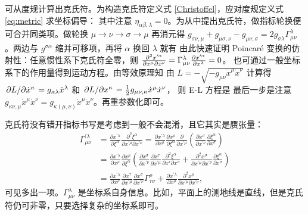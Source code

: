 可从度规计算出克氏符。为构造克氏符定义式 \eqref{Christoffel}，应对度规定义式 \eqref{eq:metric} 求坐标偏导：
其中注意 $\eta_{\alpha\beta,\lambda}=0$。为从中提出克氏符，做指标轮换便可合并同类项。做轮换 $\mu\to\nu\to\sigma\to\mu$ 再消元得 $g_{\sigma\nu,\mu}+ g_{\mu\sigma,\nu}-  g_{\mu\nu,\sigma}=2g_{\sigma\lambda}\Gamma^\lambda_{\mu\nu}$。两边与 $g^{\sigma\alpha}$ 缩并可移项，再将 $\alpha$ 换回 $\lambda$ 就有
由此快速证明 Poincaré 变换的仿射性：任意惯性系下克氏符全零，则 $\pdv{x'^\alpha}{x^\mu}{x^\nu}=\Gamma^\lambda_{\mu\nu}\pdv{x'^\alpha}{x^\lambda}=0$。
也可通过一般坐标系下的作用量得到运动方程。由等效原理知
由 $L=-\sqrt{-g_{\mu\nu}\dot x^\mu\dot x^\nu}$ 计算得 $\pdv*{L}{\dot x^\kappa}=g_{\kappa\lambda}\dot x^\lambda$ 和 $\pdv*{L}{x^\kappa}=\frac{1}{2}g_{\mu\nu,\kappa}\dot x^\mu\dot x^\nu$，
则 E-L 方程是
最后一步是注意 $g_{\kappa\nu,\mu}\dot x^\mu\dot x^\nu=g_{\kappa(\mu,\nu)}\dot x^\mu\dot x^\nu$。再重参数化即可。

克氏符没有错开指标书写是考虑到一般不会混淆，且它其实是赝张量：
\begin{align} \Gamma_{\mu \nu}^{\prime \lambda} &= \frac{\partial x^{\prime \lambda}}{\partial \xi^\alpha} \frac{\partial^2 \xi^\alpha}{\partial x^{\prime \mu} \partial x^{\prime \nu}}=\frac{\partial x^{\prime \lambda}}{\partial x^\rho} \frac{\partial x^\rho}{\partial \xi^\alpha} \frac{\partial}{\partial x^{\prime \mu}}\left(\frac{\partial x^\sigma}{\partial x^{\prime \nu}} \frac{\partial \xi^\alpha}{\partial x^\sigma}\right)\nonumber\\ 
    & =\frac{\partial x^{\prime \lambda}}{\partial x^\rho} \frac{\partial x^\rho}{\partial \xi^\alpha}\left(\frac{\partial x^\sigma}{\partial x^{\prime \nu}} \frac{\partial x^\tau}{\partial x^{\prime \mu}} \frac{\partial^2 \xi^\alpha}{\partial x^\tau \partial x^\sigma}+\frac{\partial^2 x^\sigma}{\partial x^{\prime \mu} \partial x^{\prime \nu}} \frac{\partial \xi^\alpha}{\partial x^\sigma}\right)\nonumber\\
&=\frac{\partial x^{\prime \lambda}}{\partial x^\rho} \frac{\partial x^\tau}{\partial x^{\prime \mu}} \frac{\partial x^\sigma}{\partial x^{\prime \nu}} \Gamma_{\tau \sigma}^\rho+\frac{\partial x^{\prime \lambda}}{\partial x^\rho} \frac{\partial^2 x^\rho}{\partial x^{\prime \mu} \partial x^{\prime \nu}},
\end{align}
可见多出一项。$\Gamma^{\lambda}_{\mu\nu}$ 是坐标系自身信息。比如，平面上的测地线是直线，但是克氏符仍可非零，只要选择复杂的坐标系即可。

